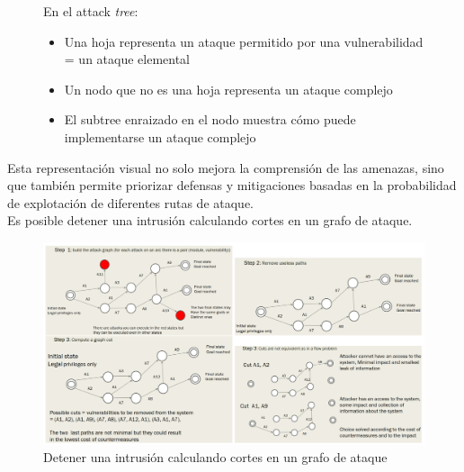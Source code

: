 \begin{enumerate}[resume]
\begin{figure}[htbp]
   {En el attack \textit{tree}:\ns
      \begin{itemize}
         \item Una hoja representa un ataque permitido por una vulnerabilidad = un ataque elemental
         \item Un nodo que no es una hoja representa un ataque complejo
         \item El subtree enraizado en el nodo muestra cómo puede implementarse un ataque complejo
      \end{itemize}}
\end{figure}

Esta representación visual no solo mejora la comprensión de las amenazas, sino que también permite priorizar defensas y mitigaciones basadas en la probabilidad de explotación de diferentes rutas de ataque.\\
Es posible detener una intrusión calculando cortes en un grafo de ataque.
\begin{figure}[htbp]
   \centering
   \includegraphics{images/00/graphintrusions.png}
   \caption{Detener una intrusión calculando cortes en un grafo de ataque}
   \label{fig:00/graphintrusions}
\end{figure}


\end{enumerate}
